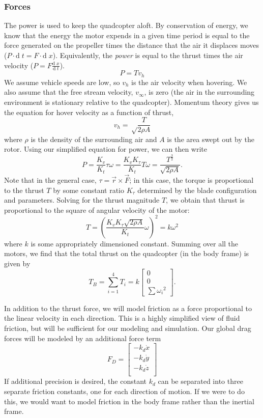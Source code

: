 \documentclass{article}
\newcommand\bmatr[1]{\begin{bmatrix} #1\end{bmatrix}}
\newcommand\dd{\text{d}\;}
\begin{document}
\subsubsection*{Forces}
The power is used to keep the quadcopter aloft. By conservation of energy, we know that the 
energy the motor expends in a given time period is equal to the force generated on the propeller
times the distance that the air it displaces moves ($P\cdot \dd t = F \cdot \dd x$). Equivalently, the \emph{power} is equal to the
thrust times the air velocity ($P = F\frac{\dd x}{\dd t}$).
\[P = Tv_h\]
We assume vehicle speeds are low, so $v_h$ is the air velocity when hovering. We also assume that
the free stream velocity, $v_\infty$, is zero (the air in the surrounding environment is stationary
relative to the quadcopter). Momentum theory gives us the equation for hover
velocity as a function of thrust,
\[v_h = \sqrt\frac{T}{2\rho A}\]
where $\rho$ is the density of the surrounding air and $A$ is the area swept out by the rotor. Using
our simplified equation for power, we can then write
\[P = \frac{K_v}{K_t} \tau \omega = \frac{K_vK_\tau}{K_t} T \omega = \frac{T^\frac{3}{2}}{\sqrt{2\rho A}}.\]
Note that in the general case, $\tau = \vec r \times \vec F$; in this case, the torque is
proportional to the thrust $T$ by some constant ratio $K_\tau$ determined by the blade configuration
and parameters. Solving for the thrust magnitude $T$, 
we obtain that thrust is proportional to the square of angular velocity of the motor:
\[T = \left(\frac{K_vK_\tau\sqrt{2 \rho A}}{K_t} \omega\right)^2 = k\omega^2\]
where $k$ is some appropriately dimensioned constant. Summing over all the motors, 
we find that the total thrust on the quadcopter (in the body frame) is given by
\[T_B = \sum_{i=1}^4 T_i = k\bmatr{ 0 \\ 0 \\ \sum {\omega_i}^2 }.\]

In addition to the thrust force, we will model friction as a force proportional to the linear
velocity in each direction. This is a highly simplified view of fluid friction, but will be
sufficient for our modeling and simulation. Our global drag forces will be modeled by an additional
force term
\[F_D = \bmatr{
    -k_d\dot x \\
    -k_d\dot y \\
    -k_d\dot z \\
}\]
If additional precision is desired, the constant $k_d$ can be separated into three separate friction
constants, one for each direction of motion. If we were to do this, we would want to model friction
in the body frame rather than the inertial frame.
\end{document}
